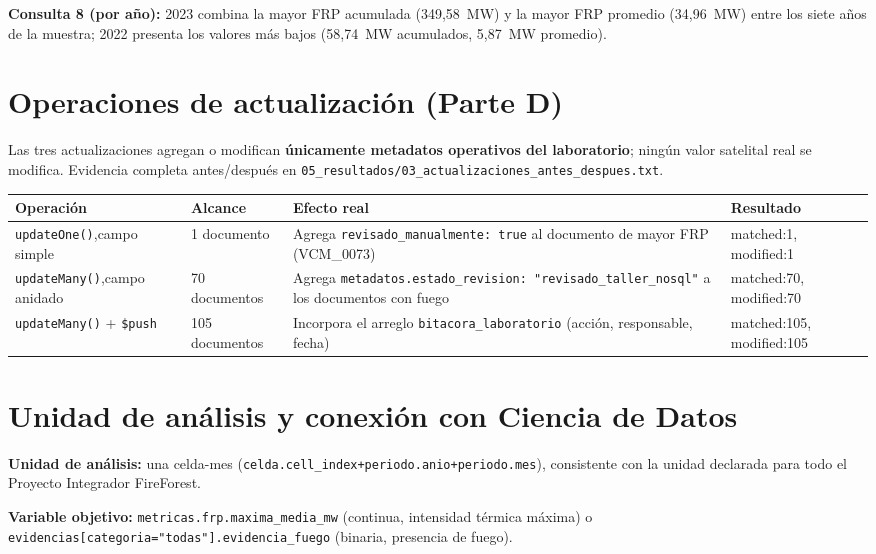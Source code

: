 \documentclass[11pt]{article}
\begin{document}
\textbf{Consulta 8 (por año):} 2023 combina la mayor FRP acumulada
(349,58~MW) y la mayor FRP promedio (34,96~MW) entre los siete años de la
muestra; 2022 presenta los valores más bajos (58,74~MW acumulados, 5,87~MW
promedio).

\section{Operaciones de actualización (Parte D)}

Las tres actualizaciones agregan o modifican \textbf{únicamente metadatos
operativos del laboratorio}; ningún valor satelital real se modifica.
Evidencia completa antes/después en
\texttt{05\_resultados/03\_actualizaciones\_antes\_despues.txt}.

\begin{center}
\small
\begin{tabular}{p{2.4cm}p{2.4cm}p{5.3cm}p{2.6cm}}
\toprule
\textbf{Operación} & \textbf{Alcance} & \textbf{Efecto real} & \textbf{Resultado} \\
\midrule
\texttt{updateOne()},\newline campo simple &
1 documento &
Agrega \lstinline!revisado_manualmente: true! al documento de mayor FRP (VCM\_0073) &
matched:1, modified:1 \\
\midrule
\texttt{updateMany()},\newline campo anidado &
70 documentos &
Agrega \lstinline!metadatos.estado_revision: "revisado_taller_nosql"! a los documentos con fuego &
matched:70, modified:70 \\
\midrule
\texttt{updateMany()} + \lstinline!$push! &
105 documentos &
Incorpora el arreglo \lstinline!bitacora_laboratorio! (acción, responsable, fecha) &
matched:105, modified:105 \\
\bottomrule
\end{tabular}
\end{center}

\section{Unidad de análisis y conexión con Ciencia de Datos}

\textbf{Unidad de análisis:} una celda-mes
(\lstinline!celda.cell_index+periodo.anio+periodo.mes!), consistente con la
unidad declarada para todo el Proyecto Integrador FireForest.

\textbf{Variable objetivo:} \lstinline!metricas.frp.maxima_media_mw!
(continua, intensidad térmica máxima) o
\lstinline!evidencias[categoria="todas"].evidencia_fuego! (binaria,
presencia de fuego).
\end{document}
